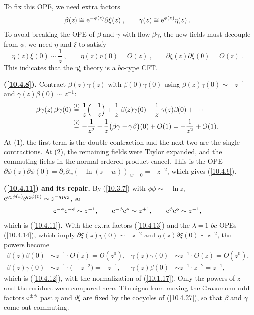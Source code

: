 	To fix this OPE, we need extra factors
	\begin{equation}
		\beta(z)\cong \mathrm{e}^{-\phi(z)} \partial\xi(z) \:, \qquad \gamma(z)\cong\mathrm{e}^{\phi(z)}\eta(z)\:. \label{10.4.13}
	\end{equation}
	To avoid breaking the OPE of $\beta$ and $\gamma$ with flow $\beta\gamma$, the new fields must decouple from $\phi$; we need $\eta$ and $\xi$ to satisfy
	\begin{equation}
		\eta(z)\xi(0) \sim \frac{1}{z} \:, \qquad 
		\eta(z)\eta(0) = O(z) \:, \qquad 
		\partial\xi(z)\partial\xi(0) =O(z) \:. \label{10.4.14}
	\end{equation}
	This indicates that the $\eta\xi$ theory is a $bc$-type CFT.
	\begin{tcolorbox}[breakable]
		\begin{remark}
			\textbf{(\ref{10.4.8}).} Contract $\beta(z)\gamma(z)$ with $\beta(0)\gamma(0)$ using $\beta(z)\gamma(0)\sim-z^{-1}$ and $\gamma(z)\beta(0)\sim z^{-1}$:
			\begin{align*}
				\beta\gamma(z)\,\beta\gamma(0)&\overset{(1)}{=}\frac{1}{z}\Bigl(-\frac1z\Bigr)+\frac{1}{z}\,\beta(z)\gamma(0)-\frac1z\,\gamma(z)\beta(0)+\cdots\\
				&\overset{(2)}{=}-\frac{1}{z^{2}}+\frac{1}{z}\bigl(\beta\gamma-\gamma\beta\bigr)(0)+O(1)=-\frac{1}{z^{2}}+O(1) .
			\end{align*}
			At (1), the first term is the double contraction and the next two are the single contractions. At (2), the remaining fields were Taylor expanded, and the commuting fields in the normal-ordered product cancel. This is the OPE $\partial\phi(z)\partial\phi(0)=\partial_z\partial_w(-\ln(z-w))\big|_{w=0}=-z^{-2}$, which gives (\ref{10.4.9}).

			\textbf{(\ref{10.4.11}) and its repair.} By (\ref{10.3.7}) with $\phi\phi\sim-\ln z$, $\mathrm{e}^{q_1\phi(z)}\mathrm{e}^{q_2\phi(0)}\sim z^{-q_1q_2}$, so
			\begin{equation*}
				\mathrm{e}^{-\phi}\mathrm{e}^{-\phi}\sim z^{-1},\qquad \mathrm{e}^{-\phi}\mathrm{e}^{\phi}\sim z^{+1},\qquad \mathrm{e}^{\phi}\mathrm{e}^{\phi}\sim z^{-1},
			\end{equation*}
			which is (\ref{10.4.11}). With the extra factors (\ref{10.4.13}) and the $\lambda=1$ $bc$ OPEs (\ref{10.4.14}), which imply $\partial\xi(z)\eta(0)\sim-z^{-2}$ and $\eta(z)\partial\xi(0)\sim z^{-2}$, the powers become
			\begin{align*}
				\beta(z)\beta(0)&\sim z^{-1}\cdot O(z)=O(z^{0}),&\gamma(z)\gamma(0)&\sim z^{-1}\cdot O(z)=O(z^{0}),\\
				\beta(z)\gamma(0)&\sim z^{+1}\cdot\bigl(-z^{-2}\bigr)=-z^{-1},&\gamma(z)\beta(0)&\sim z^{+1}\cdot z^{-2}=z^{-1},
			\end{align*}
			which is (\ref{10.4.12}), with the normalization of (\ref{10.1.17}). Only the powers of $z$ and the residues were compared here. The signs from moving the Grassmann-odd factors $\mathrm{e}^{\pm\phi}$ past $\eta$ and $\partial\xi$ are fixed by the cocycles of (\ref{10.4.27}), so that $\beta$ and $\gamma$ come out commuting.
		\end{remark}
	\end{tcolorbox}
	
